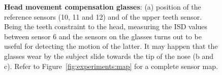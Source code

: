 \begin{figure}
	\centering
		\hspace{0.05\textwidth}
		\hspace{0.05\textwidth}
	\caption[Head movement compensation glasses]{\textbf{Head movement
	compensation glasses}: (a) position of the reference sensors (10, 11 and 12)
	and of the upper teeth sensor. Being the teeth constraint to the head,
	measuring the ISD values between sensor 6 and the sensors on the glasses
	turns out to be useful for detecting the motion of the latter. It may happen
	that the glasses wear by the subject slide towards the tip of the nose (b
	and c). Refer to Figure~\ref{fig:experiments:map} for a complete sensor
	map.}
	\label{fig:linguometer:technical:glasses}
\end{figure}
